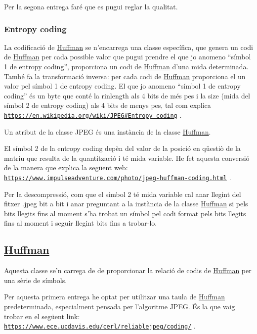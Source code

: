 Per la segona entrega faré que es pugui reglar la qualitat.

\subsubsection*{Entropy coding}

La codificació de \hyperlink{classHuffman}{Huffman} se n’encarrega una classe específica, que genera un codi de \hyperlink{classHuffman}{Huffman} per cada possible valor que pugui prendre el que jo anomeno “símbol 1 de entropy coding”, proporciona un codi de \hyperlink{classHuffman}{Huffman} d’una mida determinada. També fa la transformació inversa\+: per cada codi de \hyperlink{classHuffman}{Huffman} proporciona el un valor pel símbol 1 de entropy coding. El que jo anomeno “símbol 1 de entropy coding” és un byte que conté la rinlength als 4 bits de més pes i la size (mida del símbol 2 de entropy coding) als 4 bits de menys pes, tal com explica \href{https://en.wikipedia.org/wiki/JPEG#Entropy_coding}{\tt https\+://en.\+wikipedia.\+org/wiki/\+J\+P\+E\+G\#\+Entropy\+\_\+coding} .

Un atribut de la classe J\+P\+EG és una instància de la classe \hyperlink{classHuffman}{Huffman}.

El símbol 2 de la entropy coding depèn del valor de la posició en qüestiò de la matriu que resulta de la quantització i té mida variable. He fet aquesta conversió de la manera que explica la següent web\+: \href{https://www.impulseadventure.com/photo/jpeg-huffman-coding.html}{\tt https\+://www.\+impulseadventure.\+com/photo/jpeg-\/huffman-\/coding.\+html} .

Per la descompressió, com que el símbol 2 té mida variable cal anar llegint del fitxer .jpeg bit a bit i anar preguntant a la instància de la classe \hyperlink{classHuffman}{Huffman} si pels bits llegits fins al moment s’ha trobat un símbol pel codi format pels bits llegits fins al moment i seguir llegint bits fins a trobar-\/lo.

\subsection*{\hyperlink{classHuffman}{Huffman}}

Aquesta classe se’n carrega de de proporcionar la relació de codis de \hyperlink{classHuffman}{Huffman} per una sèrie de símbols.

Per aquesta primera entrega he optat per utilitzar una taula de \hyperlink{classHuffman}{Huffman} predeterminada, especialment pensada per l’algoritme J\+P\+EG. És la que vaig trobar en el següent link\+: \href{https://www.ece.ucdavis.edu/cerl/reliablejpeg/coding/}{\tt https\+://www.\+ece.\+ucdavis.\+edu/cerl/reliablejpeg/coding/} .

